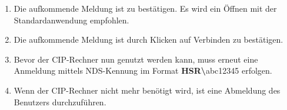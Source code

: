\documentclass[13pt,a4paper, listof=entryprefix, bibliography=totocnumbered,toc=listofnumbered,lof=listofnumbered]{scrartcl}
\begin{document}
\begin{appendix}
\begin{enumerate}
				\item Die aufkommende Meldung ist zu bestätigen. Es wird ein Öffnen mit der Standardanwendung empfohlen.

				\medskip
				\item Die aufkommende Meldung ist durch Klicken auf \glqq Verbinden\grqq{} zu bestätigen.

				
				\item Bevor der CIP-Rechner nun genutzt werden kann, muss erneut eine Anmeldung mittels NDS-Kennung im Format \textbf{HSR\textbackslash}abc12345 erfolgen.
				
				\medskip
				\item Wenn der CIP-Rechner nicht mehr benötigt wird, ist eine Abmeldung des Benutzers durchzuführen.
				
				
			\end{enumerate}	
			
			
		\end{appendix}
    
\pagebreak


	
\end{document}
